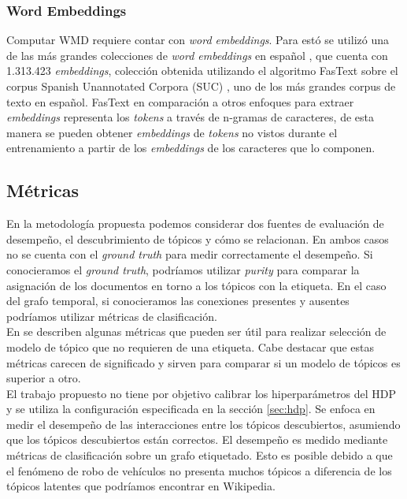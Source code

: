 \documentclass[letterpaper,12pt,oneside]{book} %
\begin{document}
\subsubsection{Word Embeddings}

Computar WMD requiere contar con \textit{word embeddings}. Para estó se utilizó una de las más grandes colecciones de \textit{word embeddings} en español \citep{fastextSUC}, que cuenta con 1.313.423 \textit{embeddings}, colección obtenida utilizando el algoritmo FasText \citep{bojanowski2017enriching} sobre el corpus Spanish Unannotated Corpora (SUC) \citep{josecanneteSUC}, uno de los más grandes corpus de texto en español. FasText en comparación a otros enfoques para extraer \textit{embeddings} representa los \textit{tokens} a través de n-gramas de caracteres, de esta manera se pueden obtener \textit{embeddings} de \textit{tokens} no vistos durante el entrenamiento a partir de los \textit{embeddings} de los caracteres que lo componen.

\subsection{Métricas}

En la metodología propuesta podemos considerar dos fuentes de evaluación de desempeño, el descubrimiento de tópicos y cómo se relacionan. En ambos casos no se cuenta con el \textit{ground truth} para medir correctamente el desempeño. Si conocieramos el \textit{ground truth}, podríamos utilizar \textit{purity} \citep{manning2008introduction} para comparar la asignación de los documentos en torno a los tópicos con la etiqueta. En el caso del grafo temporal, si conocieramos las conexiones presentes y ausentes podríamos utilizar métricas de clasificación.\\

En \citep{blei2003latent,griffiths2004finding,cao2009density,arun2010finding,deveaud2014accurate,zhang2017lda} se describen algunas métricas que pueden ser útil para realizar selección de modelo de tópico que no requieren de una etiqueta. Cabe destacar que estas métricas carecen de significado y sirven para comparar si un modelo de tópicos es superior a otro.\\

El trabajo propuesto no tiene por objetivo calibrar los hiperparámetros del HDP y se utiliza la configuración especificada en la sección \ref{sec:hdp}. Se enfoca en medir el desempeño de las interacciones entre los tópicos descubiertos, asumiendo que los tópicos descubiertos están correctos. El desempeño es medido mediante métricas de clasificación sobre un grafo etiquetado. Esto es posible  debido a que el fenómeno de robo de vehículos no presenta muchos tópicos a diferencia de los tópicos latentes que podríamos encontrar en Wikipedia.\\
\end{document}
